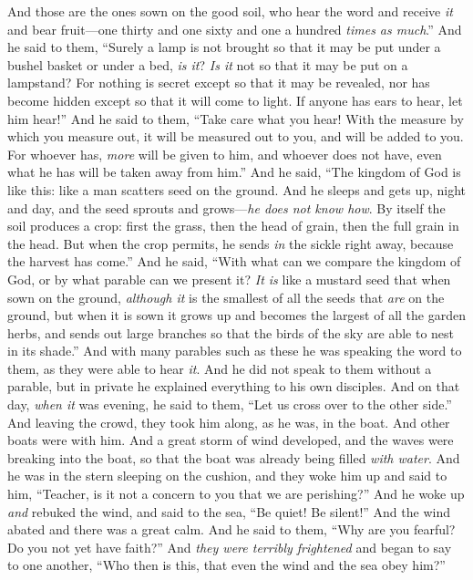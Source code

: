 \begin{biblechapter}
\verse And those are the ones sown on the good soil, who hear the word and receive \textit{it} and bear fruit—one thirty and one sixty and one a hundred \textit{times as much}.”
 And he said to them, “Surely a lamp is not brought so that it may be put under a bushel basket or under a bed, \textit{is it}? \textit{Is it} not so that it may be put on a lampstand?
\verse For nothing is secret except so that it may be revealed, nor has become hidden except so that it will come to light.
\verse If anyone has ears to hear, let him hear!”
\verse And he said to them, “Take care what you hear! With the measure by which you measure out, it will be measured out to you, and will be added to you.
\verse For whoever has, \textit{more} will be given to him, and whoever does not have, even what he has will be taken away from him.”
 And he said, “The kingdom of God is like this: like a man scatters seed on the ground.
\verse And he sleeps and gets up, night and day, and the seed sprouts and grows—\textit{he does not know how}.
\verse By itself the soil produces a crop: first the grass, then the head of grain, then the full grain in the head.
\verse But when the crop permits, he sends \textit{in} the sickle right away, because the harvest has come.”
 And he said, “With what can we compare the kingdom of God, or by what parable can we present it?
\verse \textit{It is} like a mustard seed that when sown on the ground, \textit{although it} is the smallest of all the seeds that \textit{are} on the ground,
\verse but when it is sown it grows up and becomes the largest of all the garden herbs, and sends out large branches so that the birds of the sky are able to nest in its shade.”
\verse And with many parables such as these he was speaking the word to them, as they were able to hear \textit{it}.
\verse And he did not speak to them without a parable, but in private he explained everything to his own disciples.
 And on that day, \textit{when it} was evening, he said to them, “Let us cross over to the other side.”
\verse And leaving the crowd, they took him along, as he was, in the boat. And other boats were with him.
\verse And a great storm of wind developed, and the waves were breaking into the boat, so that the boat was already being filled \textit{with water}.
\verse And he was in the stern sleeping on the cushion, and they woke him up and said to him, “Teacher, is it not a concern to you that we are perishing?”
\verse And he woke up \textit{and} rebuked the wind, and said to the sea, “Be quiet! Be silent!” And the wind abated and there was a great calm.
\verse And he said to them, “Why are you fearful? Do you not yet have faith?”
\verse And \textit{they were terribly frightened} and began to say to one another, “Who then is this, that even the wind and the sea obey him?”
\end{biblechapter}

